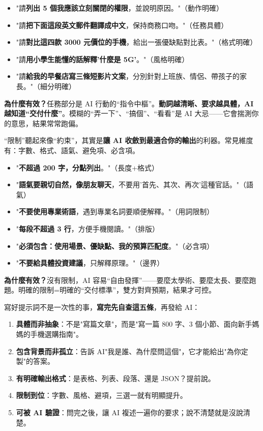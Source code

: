 
\begin{itemize}
  \item "請\textbf{列出 5 個我應該立刻關閉的權限}，並說明原因。"（動作明確）
  \item "請\textbf{把下面這段英文郵件翻譯成中文}，保持商務口吻。"（任務具體）
  \item "請\textbf{對比這四款 3000 元價位的手機}，給出一張優缺點對比表。"（格式明確）
  \item "請\textbf{用小學生能懂的話解釋'什麼是 5G'}。"（風格明確）
  \item "請\textbf{給我的早餐店寫三條短影片文案}，分別針對上班族、情侶、帶孩子的家長。"（細分明確）
\end{itemize}

\textbf{為什麼有效？}任務部分是 AI 行動的“指令中樞”。\textbf{動詞越清晰、要求越具體，AI 越知道“交付什麼”}。模糊的“弄一下”、“搞個”、“看看”是 AI 大忌——它會揣測你的意思，結果常常跑偏。


“限制”聽起來像“約束”，其實是\textbf{讓 AI 收斂到最適合你的輸出}的利器。常見維度有：字數、格式、語氣、避免項、必含項。


\begin{itemize}
  \item "\textbf{不超過 200 字，分點列出}。"（長度+格式）
  \item "\textbf{語氣要親切自然，像朋友聊天}，不要用'首先、其次、再次'這種官話。"（語氣）
  \item "\textbf{不要使用專業術語}，遇到專業名詞要順便解釋。"（用詞限制）
  \item "\textbf{每段不超過 3 行}，方便手機閱讀。"（排版）
  \item "\textbf{必須包含：使用場景、優缺點、我的預算匹配度}。"（必含項）
  \item "\textbf{不要給具體投資建議}，只解釋原理。"（邊界）
\end{itemize}

\textbf{為什麼有效？}沒有限制，AI 容易“自由發揮”——要麼太學術、要麼太長、要麼跑題。明確的限制=明確的“交付標準”，雙方對齊預期，結果才可控。


寫好提示詞不是一次性的事，\textbf{寫完先自查這五條}，再發給 AI：

\begin{enumerate}
  \item \textbf{具體而非抽象}：不是"寫篇文章"，而是"寫一篇 800 字、3 個小節、面向新手媽媽的手機選購指南"。
  \item \textbf{包含背景而非孤立}：告訴 AI"我是誰、為什麼問這個"，它才能給出"為你定製"的答案。
  \item \textbf{有明確輸出格式}：是表格、列表、段落、還是 JSON？提前說。
  \item \textbf{限制到位}：字數、風格、避項，三選一就有明顯提升。
  \item \textbf{可被 AI 驗證}：問完之後，讓 AI 複述一遍你的要求；說不清楚就是沒說清楚。
\end{enumerate}

